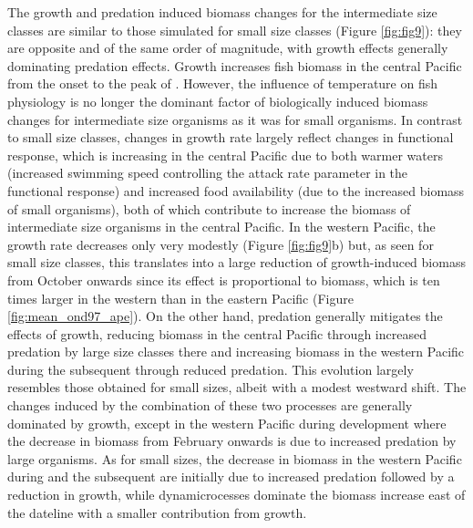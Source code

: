 The growth and predation induced biomass changes for the intermediate size classes are similar to those simulated for small size classes (Figure \ref{fig:fig9}): they are opposite and of the same order of magnitude, with growth effects generally dominating predation effects. Growth increases fish biomass in the central Pacific from the onset to the peak of \nino{}. However, the influence of temperature on fish physiology is no longer the dominant factor of biologically induced biomass changes for intermediate size organisms as it was for small organisms. In contrast to small size classes, changes in growth rate largely reflect changes in functional response, which is increasing in the central Pacific due to both warmer waters (increased swimming speed controlling the attack rate parameter in the functional response) and increased food availability (due to the increased biomass of small organisms), both of which contribute to increase the biomass of intermediate size organisms in the central Pacific. In the western Pacific, the growth rate decreases only very modestly (Figure \ref{fig:fig9}b) but, as seen for small size classes, this translates into a large reduction of growth-induced biomass from October onwards since its effect is proportional to biomass, which is ten times larger in the western than in the eastern Pacific (Figure \ref{fig:mean_ond97_ape}).
On the other hand, predation generally mitigates the effects of growth, reducing biomass in the central Pacific through increased predation by large size classes there and increasing biomass in the western Pacific during the subsequent \nina{} through reduced predation. This evolution largely resembles those obtained for small sizes, albeit with a modest westward shift. The changes induced by the combination of these two processes are generally dominated by growth, except in the western Pacific during \nino{} development where the  decrease in biomass from February onwards is due to increased predation by large organisms. As for small sizes, the decrease in biomass in the western Pacific during \nino{} and the subsequent \nina{} are initially due to increased predation followed by a reduction in growth, while dynamicrocesses dominate the biomass increase east of the dateline with a smaller contribution from growth.

